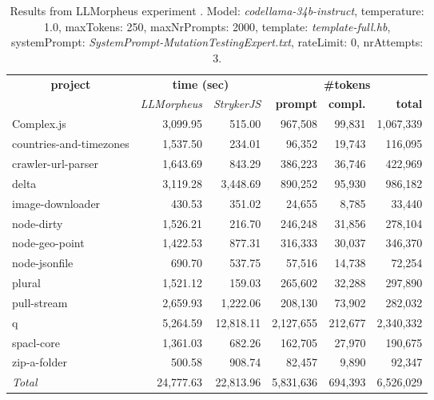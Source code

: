 
\begin{table*}[hbt!]
\centering
{\scriptsize
\begin{tabular}{l||r|r|r|r|r}
\multicolumn{1}{c|}{\bf project} & \multicolumn{2}{|c|}{\bf time (sec)} & \multicolumn{3}{|c|}{\bf \#tokens} \\
               & {\it LLMorpheus} & {\it StrykerJS} & {\bf prompt} & {\bf compl.} & {\bf total} \\
\hline
  Complex.js & 3,099.95 & 515.00 & 967,508 & 99,831 & 1,067,339 \\ 
countries-and-timezones & 1,537.50 & 234.01 & 96,352 & 19,743 & 116,095 \\ 
crawler-url-parser & 1,643.69 & 843.29 & 386,223 & 36,746 & 422,969 \\ 
delta & 3,119.28 & 3,448.69 & 890,252 & 95,930 & 986,182 \\ 
image-downloader & 430.53 & 351.02 & 24,655 & 8,785 & 33,440 \\ 
node-dirty & 1,526.21 & 216.70 & 246,248 & 31,856 & 278,104 \\ 
node-geo-point & 1,422.53 & 877.31 & 316,333 & 30,037 & 346,370 \\ 
node-jsonfile & 690.70 & 537.75 & 57,516 & 14,738 & 72,254 \\ 
plural & 1,521.12 & 159.03 & 265,602 & 32,288 & 297,890 \\ 
pull-stream & 2,659.93 & 1,222.06 & 208,130 & 73,902 & 282,032 \\ 
q & 5,264.59 & 12,818.11 & 2,127,655 & 212,677 & 2,340,332 \\ 
spacl-core & 1,361.03 & 682.26 & 162,705 & 27,970 & 190,675 \\ 
zip-a-folder & 500.58 & 908.74 & 82,457 & 9,890 & 92,347 \\ 
\hline
  \textit{Total} & 24,777.63 & 22,813.96 & 5,831,636 & 694,393 & 6,526,029 \\
  \end{tabular}
  }
  \\[2mm]
  \caption{Results from LLMorpheus experiment .
    Model: \textit{codellama-34b-instruct}, 
    temperature: 1.0, 
    maxTokens: 250, 
    maxNrPrompts: 2000, 
    template: \textit{template-full.hb}, 
    systemPrompt: \textit{SystemPrompt-MutationTestingExpert.txt}, 
    rateLimit: 0, 
    nrAttempts: 3.  
  }
  \label{table:Cost:run342:codellama-34b-instruct:template-full.hb:1.0}
\end{table*}